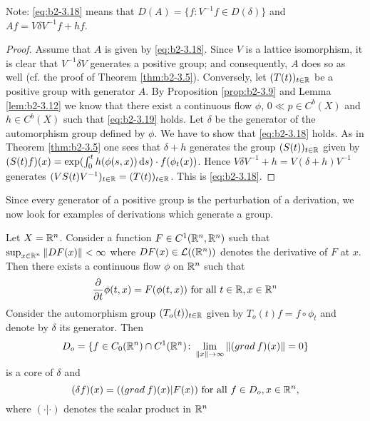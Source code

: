 Note: \eqref{eq:b2-3.18} means that $D(A) = \{ f \colon V^{-1}f \in D(\delta) \}$ and $Af = V\delta V^{-1}f + hf$.
\begin{proof}
Assume that $A$ is given by \eqref{eq:b2-3.18}.
Since $V$ is a lattice isomorphism, it is clear that $V^{-1}\delta V$ generates a positive group; and consequently, $A$ does so as well (cf. the proof of Theorem \ref{thm:b2-3.5}).
Conversely, let $(T(t))_{t \in \mathbb{R}}$ be a positive group with generator $A$.
By Proposition \ref{prop:b2-3.9} and Lemma \ref{lem:b2-3.12} we know that there exist a continuous flow $\phi$, $0 \ll p \in C^{b}(X)$ and $h \in C^{b}(X)$ such that \eqref{eq:b2-3.19} holds.
Let $\delta$ be the generator of the automorphism group defined by $\phi$.
We have to show that \eqref{eq:b2-3.18} holds.
As in Theorem \ref{thm:b2-3.5} one sees that $\delta + h$ generates the group $(S(t))_{t \in \mathbb{R}}$ given by $(S(t)f)(x) = \exp(\int_{0}^{t} h(\phi(s,x)) \mathop{}\!\mathrm{d}{s}) \cdot f(\phi_{t}(x))$.
Hence $V\delta V^{-1} + h = V(\delta + h)V^{-1}$ generates $(VS(t)V^{-1})_{t \in \mathbb{R}} = (T(t))_{t \in \mathbb{R}}$.
This is \eqref{eq:b2-3.18}.
\end{proof}
Since every generator of a positive group is the perturbation of a derivation, we now look for examples of derivations which generate a group.
\begin{example}\label{ex:b2-3.15}
Let $X = \mathbb{R}^{n}$.
Consider a function $F \in C^{1}(\mathbb{R}^{n},\mathbb{R}^{n})$ such that $\sup_{x \in \mathbb{R}^{n}} \|DF(x)\| < \infty$ where $DF(x) \in \mathcal{L}((\mathbb{R}^{n}))$ denotes the derivative of $F$ at $x$.
Then there exists a continuous flow $\phi$ on $\mathbb{R}^{n}$ such that
\begin{equation}\label{eq:b2-3.20}
\frac{\partial}{\partial t} \phi(t,x) = F(\phi(t,x)) \text{ for all } t \in \mathbb{R}, x \in \mathbb{R}^{n}
\end{equation}
Consider the automorphism group $(T_{o}(t))_{t \in \mathbb{R}}$ given by $T_{o}(t)f = f \circ \phi_{t}$
and denote by $\delta$ its generator.
Then 
\[D_{o} = \{ f \in C_{0}(\mathbb{R}^{n}) \cap C^{1}(\mathbb{R}^{n}) \colon \lim_{\|x\| \to \infty} \|(grad\: f)(x)\| = 0 \}
\]
is a core of $\delta$ and
\begin{equation}\label{eq:b2-3.21}
(\delta f)(x) = ((grad\: f)(x) | F(x)) \text{ for all } f \in D_{o}, x \in \mathbb{R}^{n},
\end{equation}
where $(\cdot|\cdot)$ denotes the scalar product in $\mathbb{R}^{n}$
\end{example}
